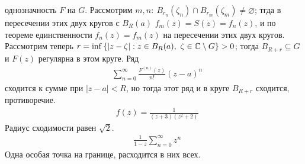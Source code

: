 однозначность $F$ на $G$. Рассмотрим $m, n: \ B_{r_n}(\zeta_n)\cap
B_{r_m}(\zeta_m)\neq \varnothing$; тгда в пересечении этих двух кругов с
$B_R(a)$ $f_m(z) = S(z) = f_n(z)$, и по теореме единственности $f_n(z) = f_m(z)$
на пересечении этих двух кругов. Рассмотрим теперь $r = \inf \left\{ \left|
        z-\zeta \right| : z \in B_R(a), \ \zeta \in \mathbb{C} \setminus G\right\} >
0$; тогда $B_{R+r} \subseteq G$ и $F(z)$ регулярна в этом круге. Ряд
\begin{align*}
  & \sum_{n=0}^\infty \frac{F^{(n)}(z)}{n!}(z-a)^n
\end{align*}
сходится к сумме при $\left| z-a \right|< R$, но тогда этот ряд и в круге
$B_{R+r}$ сходится, противоречие.
\Example
\begin{align*}
  & f(z) = \frac{1}{(z+3)(z^2+2)}
\end{align*}
Радиус сходимости равен $\sqrt{2}$.
\Example
\begin{align*}
  & \frac{1}{1-z} \sum_{n=0}^{\infty} z^n
\end{align*}
Одна особая точка на границе, расходится в них всех.